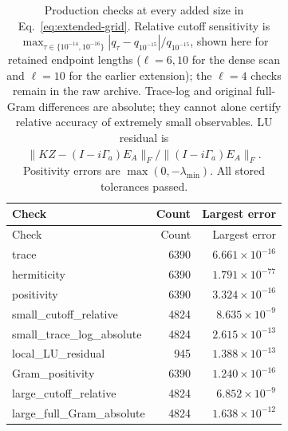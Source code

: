 \begin{longtable}{lrr}
\caption{Production checks at every added size in Eq.~\eqref{eq:extended-grid}. Relative cutoff sensitivity is $\max_{\tau\in\{10^{-14},10^{-16}\}}|q_\tau-q_{10^{-15}}|/q_{10^{-15}}$, shown here for retained endpoint lengths ($\ell=6,10$ for the dense scan and $\ell=10$ for the earlier extension); the $\ell=4$ checks remain in the raw archive. Trace-log and original full-Gram differences are absolute; they cannot alone certify relative accuracy of extremely small observables. LU residual is $\|KZ-(I-i\Gamma_a)E_A\|_F/\|(I-i\Gamma_a)E_A\|_F$. Positivity errors are $\max(0,-\lambda_{\min})$. All stored tolerances passed.}
\label{tab:scaling-numerical-checks}\\\toprule
Check & Count & Largest error\\\midrule
\endfirsthead
\toprule
Check & Count & Largest error\\\midrule
\endhead
\bottomrule\endfoot
trace & 6390 & $6.661\!\times\!10^{-16}$\\
hermiticity & 6390 & $1.791\!\times\!10^{-77}$\\
positivity & 6390 & $3.324\!\times\!10^{-16}$\\
small\_cutoff\_relative & 4824 & $8.635\!\times\!10^{-9}$\\
small\_trace\_log\_absolute & 4824 & $2.615\!\times\!10^{-13}$\\
local\_LU\_residual & 945 & $1.388\!\times\!10^{-13}$\\
Gram\_positivity & 6390 & $1.240\!\times\!10^{-16}$\\
large\_cutoff\_relative & 4824 & $6.852\!\times\!10^{-9}$\\
large\_full\_Gram\_absolute & 4824 & $1.638\!\times\!10^{-12}$\\
\end{longtable}
